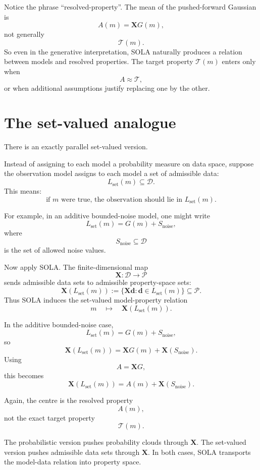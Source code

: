 \documentclass[11pt,openany]{book}
\theoremstyle{definition}
\theoremstyle{remark}
\newcommand{\D}{\mathcal D}
\newcommand{\Pspace}{\mathcal P}
\newcommand{\Tau}{\mathcal{T}}
\begin{document}
Notice the phrase ``resolved-property''. The mean of the pushed-forward Gaussian is
\[
  A(m)=\mathbf XG(m),
\]
not generally
\[
  \Tau(m).
\]
So even in the generative interpretation, SOLA naturally produces a relation between models and
resolved properties. The target property \(\Tau(m)\) enters only when
\[
  A\approx\Tau,
\]
or when additional assumptions justify replacing one by the other.

\section{The set-valued analogue}

There is an exactly parallel set-valued version.

Instead of assigning to each model a probability measure on data space, suppose the observation
model assigns to each model a set of admissible data:
\[
  L_{\mathrm{set}}(m)\subseteq\D.
\]
This means:
\[
  \text{if }m\text{ were true, the observation should lie in }L_{\mathrm{set}}(m).
\]

For example, in an additive bounded-noise model, one might write
\[
  L_{\mathrm{set}}(m)
  =
  G(m)+S_{\mathrm{noise}},
\]
where
\[
  S_{\mathrm{noise}}\subseteq\D
\]
is the set of allowed noise values.

Now apply SOLA. The finite-dimensional map
\[
  \mathbf X:\D\to\Pspace
\]
sends admissible data sets to admissible property-space sets:
\[
  \mathbf X(L_{\mathrm{set}}(m))
  :=
  \{\mathbf X\mathbf d:\mathbf d\in L_{\mathrm{set}}(m)\}
  \subseteq\Pspace.
\]
Thus SOLA induces the set-valued model-property relation
\[
  m
  \quad\longmapsto\quad
  \mathbf X(L_{\mathrm{set}}(m)).
\]

In the additive bounded-noise case,
\[
  L_{\mathrm{set}}(m)
  =
  G(m)+S_{\mathrm{noise}},
\]
so
\[
  \mathbf X(L_{\mathrm{set}}(m))
  =
  \mathbf XG(m)+\mathbf X(S_{\mathrm{noise}}).
\]
Using
\[
  A=\mathbf XG,
\]
this becomes
\[
  \mathbf X(L_{\mathrm{set}}(m))
  =
  A(m)+\mathbf X(S_{\mathrm{noise}}).
\]

Again, the centre is the resolved property
\[
  A(m),
\]
not the exact target property
\[
  \Tau(m).
\]

\begin{intuitionbox}
The probabilistic version pushes probability clouds through \(\mathbf X\). The set-valued version
pushes admissible data sets through \(\mathbf X\). In both cases, SOLA transports the
model-data relation into property space.
\end{intuitionbox}
\end{document}
